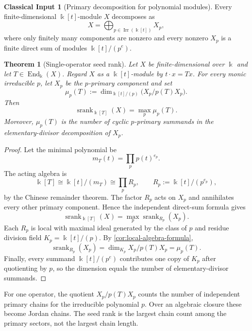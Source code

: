 \documentclass[11pt]{article}
\newtheorem{theorem}{Theorem}[section]
\theoremstyle{definition}
\newtheorem{classicalinput}[classicalinput]{Classical Input}
\theoremstyle{remark}
\theoremstyle{definition}\newtheorem{example}[theorem]{Example}
\newcommand{\bbk}{\Bbbk}
\newcommand{\srank}{\operatorname{srank}}
\newcommand{\End}{\operatorname{End}}
\newcommand{\Irr}{\operatorname{Irr}}
\newcommand{\RecordID}[1]{\label{record:#1}}
\newcommand{\Depends}[1]{}
\newcommand{\Exports}[1]{}
\begin{document}
\begin{classicalinput}[Primary decomposition for polynomial modules]
\label{ci:primary-decomposition}
Every finite-dimensional $\bbk[t]$-module $X$ decomposes as
\[
X=\bigoplus_{p\in\Irr(\bbk[t])}X_p,
\]
where only finitely many components are nonzero and every nonzero $X_p$ is a finite direct sum of modules $\bbk[t]/(p^e)$.
\end{classicalinput}
\RecordID{PSC-I-CI-PID-PRIMARY-DECOMPOSITION}

\begin{theorem}[Single-operator seed rank]
\label{thm:single-operator}
Let $X$ be finite-dimensional over $\bbk$ and let $T\in\End_{\bbk}(X)$.  Regard $X$ as a $\bbk[t]$-module by $t\cdot x=Tx$.  For every monic irreducible $p$, let $X_p$ be the $p$-primary component and set
\[
\mu_p(T):=
\dim_{\bbk[t]/(p)}\bigl(X_p/p(T)X_p\bigr).
\]
Then
\[
\boxed{
\srank_{\bbk[T]}(X)=\max_p\mu_p(T).
}
\]
Moreover, $\mu_p(T)$ is the number of cyclic $p$-primary summands in the elementary-divisor decomposition of $X_p$.
\end{theorem}
\RecordID{PSC-I-T-SINGLE-OPERATOR}
\Depends{\nolinkurl{PSC-I-CI-PID-PRIMARY-DECOMPOSITION},
\nolinkurl{PSC-I-C-LOCAL-ALGEBRA-FORMULA}, and
\nolinkurl{PSC-I-T-INDEPENDENT-DIRECT-SUM}.}
\Exports{Companion, recurrence, and residue-subsequence systems.}

\begin{proof}
Let the minimal polynomial be
\[
m_T(t)=\prod_{p}p(t)^{e_p}.
\]
The acting algebra is
\[
\bbk[T]\cong\bbk[t]/(m_T)
\cong\prod_pR_p,
\qquad
R_p:=\bbk[t]/(p^{e_p}),
\]
by the Chinese remainder theorem.  The factor $R_p$ acts on $X_p$ and annihilates every other primary component.  Hence the independent direct-sum formula gives
\[
\srank_{\bbk[T]}(X)=\max_p\srank_{R_p}(X_p).
\]
Each $R_p$ is local with maximal ideal generated by the class of $p$ and residue division field $K_p=\bbk[t]/(p)$.  By \cref{cor:local-algebra-formula},
\[
\srank_{R_p}(X_p)
=
\dim_{K_p}X_p/p(T)X_p
=
\mu_p(T).
\]
Finally, every summand $\bbk[t]/(p^e)$ contributes one copy of $K_p$ after quotienting by $p$, so the dimension equals the number of elementary-divisor summands.
\end{proof}

\begin{interpretation}
For one operator, the quotient \(X_p/p(T)X_p\) counts the number of independent primary chains for the irreducible polynomial \(p\).  Over an algebraic closure these become Jordan chains.  The seed rank is the largest chain count among the primary sectors, not the largest chain length.
\end{interpretation}
\end{document}
